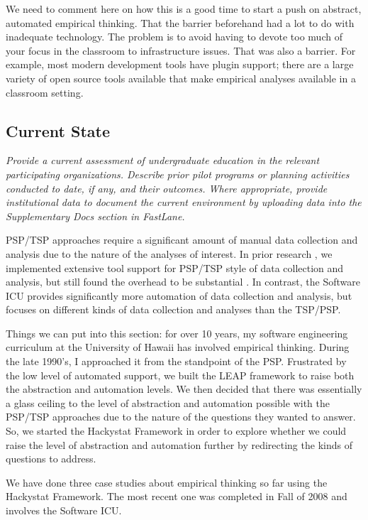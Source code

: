 We need to comment here on how this is a good time to start a push on abstract, automated empirical thinking.   That the barrier beforehand had a lot to do with inadequate technology. The problem is to avoid having to devote too much of your focus in the classroom to infrastructure issues.   That was also a barrier.  For example, most modern development tools have plugin support; there are a large variety of open source tools available that make empirical analyses available in a classroom setting. 


\subsection{Current State}

{\em Provide a current assessment of undergraduate education in the relevant participating organizations.  Describe prior pilot programs or planning activities conducted to date, if any, and their outcomes.  Where appropriate, provide institutional data to document the current environment by uploading data into the Supplementary Docs section in FastLane.}

PSP/TSP approaches require a significant amount of manual data
collection and analysis due to the nature of the analyses of interest. In
prior research \cite{csdl2-00-03}, we implemented extensive tool support
for PSP/TSP style of data collection and analysis, but still found the
overhead to be substantial \cite{csdl2-01-12}. In contrast, the Software ICU provides
significantly more automation of data collection and analysis, but focuses
on different kinds of data collection and analyses than the TSP/PSP.


Things we can put into this section:   for over 10 years, my software engineering curriculum at the University of Hawaii has involved empirical thinking.  During the late 1990's, I approached it from the standpoint of the PSP.  Frustrated by the low level of automated support, we built the LEAP framework to raise both the abstraction and automation levels.  We then decided that there was essentially a glass ceiling to the level of abstraction and automation possible with the PSP/TSP approaches due to the nature of the questions they wanted to answer. So, we started the Hackystat Framework in order to explore whether we could raise the level of abstraction and automation further by redirecting the kinds of questions to address.

We have done three case studies about empirical thinking so far using the Hackystat Framework.  The most recent one was completed in Fall of 2008 and involves the Software ICU.  

